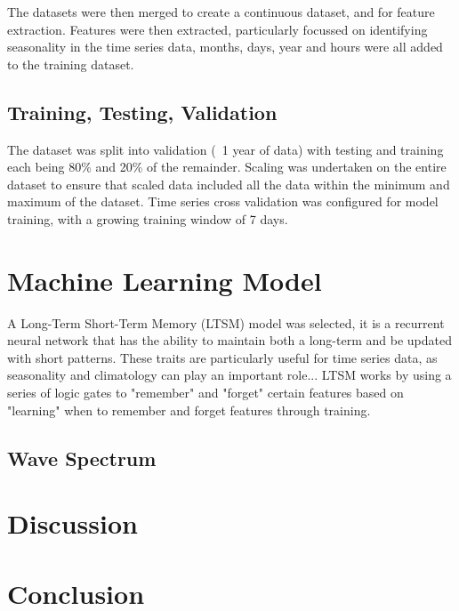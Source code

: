\documentclass[a4paper,fleqn]{cas-sc}
\begin{document}
The datasets were then merged to create a continuous dataset, and for feature extraction. Features were then extracted, particularly focussed on identifying seasonality in the time series data, months, days, year and hours were all added to the training dataset. 

\subsection{Training, Testing, Validation}
The dataset was split into validation (~1 year of data) with testing and training each being 80\% and 20\% of the remainder. Scaling was undertaken on the entire dataset to ensure that scaled data included all the data within the minimum and maximum of the dataset. 
Time series cross validation was configured for model training, with a growing training window of 7 days.

\section{Machine Learning Model}
A Long-Term Short-Term Memory (LTSM) model was selected, it is a recurrent neural network that has the ability to maintain both a long-term  and be updated with short patterns. These traits are particularly useful for time series data, as seasonality and climatology can play an important role...
LTSM works by using a series of logic gates to "remember" and "forget" certain features based on "learning" when to remember and forget features through training.

\subsection{Wave Spectrum}\label{introspec}



\section{Discussion}\label{disc}


\section{Conclusion}\label{con}


\end{document}
